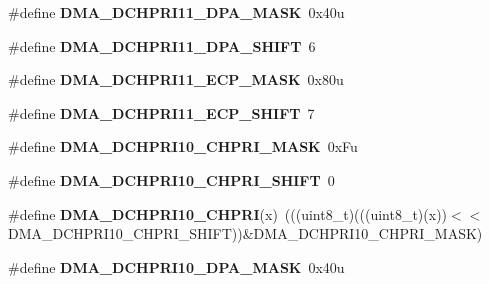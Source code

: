 \begin{DoxyCompactItemize}
\item 
\#define {\bfseries D\+M\+A\+\_\+\+D\+C\+H\+P\+R\+I11\+\_\+\+D\+P\+A\+\_\+\+M\+A\+SK}~0x40u\hypertarget{group__DMA__Register__Masks_gabd5fcd0b0589ce541af05db3c94cf62e}{}\label{group__DMA__Register__Masks_gabd5fcd0b0589ce541af05db3c94cf62e}

\item 
\#define {\bfseries D\+M\+A\+\_\+\+D\+C\+H\+P\+R\+I11\+\_\+\+D\+P\+A\+\_\+\+S\+H\+I\+FT}~6\hypertarget{group__DMA__Register__Masks_ga9d922595ae26b09e86e4c7a86a0a476f}{}\label{group__DMA__Register__Masks_ga9d922595ae26b09e86e4c7a86a0a476f}

\item 
\#define {\bfseries D\+M\+A\+\_\+\+D\+C\+H\+P\+R\+I11\+\_\+\+E\+C\+P\+\_\+\+M\+A\+SK}~0x80u\hypertarget{group__DMA__Register__Masks_ga0fa3fd877caf7576aa86d45cd74c2f14}{}\label{group__DMA__Register__Masks_ga0fa3fd877caf7576aa86d45cd74c2f14}

\item 
\#define {\bfseries D\+M\+A\+\_\+\+D\+C\+H\+P\+R\+I11\+\_\+\+E\+C\+P\+\_\+\+S\+H\+I\+FT}~7\hypertarget{group__DMA__Register__Masks_gadd7793c7e5fb49aed57108e5fef14683}{}\label{group__DMA__Register__Masks_gadd7793c7e5fb49aed57108e5fef14683}

\item 
\#define {\bfseries D\+M\+A\+\_\+\+D\+C\+H\+P\+R\+I10\+\_\+\+C\+H\+P\+R\+I\+\_\+\+M\+A\+SK}~0x\+Fu\hypertarget{group__DMA__Register__Masks_ga3b501306e4d14b013245e0cc3b4758dc}{}\label{group__DMA__Register__Masks_ga3b501306e4d14b013245e0cc3b4758dc}

\item 
\#define {\bfseries D\+M\+A\+\_\+\+D\+C\+H\+P\+R\+I10\+\_\+\+C\+H\+P\+R\+I\+\_\+\+S\+H\+I\+FT}~0\hypertarget{group__DMA__Register__Masks_ga5932de8a8d3c8b2b657f415258c430d9}{}\label{group__DMA__Register__Masks_ga5932de8a8d3c8b2b657f415258c430d9}

\item 
\#define {\bfseries D\+M\+A\+\_\+\+D\+C\+H\+P\+R\+I10\+\_\+\+C\+H\+P\+RI}(x)~(((uint8\+\_\+t)(((uint8\+\_\+t)(x))$<$$<$D\+M\+A\+\_\+\+D\+C\+H\+P\+R\+I10\+\_\+\+C\+H\+P\+R\+I\+\_\+\+S\+H\+I\+FT))\&D\+M\+A\+\_\+\+D\+C\+H\+P\+R\+I10\+\_\+\+C\+H\+P\+R\+I\+\_\+\+M\+A\+SK)\hypertarget{group__DMA__Register__Masks_ga7ee0614761b3613aab2fce3979145c3a}{}\label{group__DMA__Register__Masks_ga7ee0614761b3613aab2fce3979145c3a}

\item 
\#define {\bfseries D\+M\+A\+\_\+\+D\+C\+H\+P\+R\+I10\+\_\+\+D\+P\+A\+\_\+\+M\+A\+SK}~0x40u\hypertarget{group__DMA__Register__Masks_gaf20edd13f4d37134819d152681b34b4e}{}\label{group__DMA__Register__Masks_gaf20edd13f4d37134819d152681b34b4e}


\end{DoxyCompactItemize}
